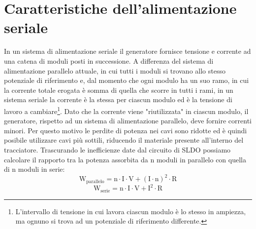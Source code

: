 \section{Caratteristiche dell'alimentazione seriale}
In un sistema di alimentazione seriale il generatore fornisce tensione e corrente ad una catena di moduli posti in successione. 
A differenza del sistema di alimentazione parallelo attuale, in cui tutti i moduli si trovano allo stesso potenziale di riferimento e, dal momento che ogni modulo ha un suo ramo, in cui la corrente totale  erogata è somma di quella che scorre in tutti i rami, in un sistema seriale la corrente è la stessa per ciascun modulo ed è la tensione di lavoro a cambiare\footnote{L'intervallo di tensione in cui lavora ciascun modulo è lo stesso in ampiezza, ma ognuno si trova ad un potenziale di riferimento differente.}. 
Dato che la corrente viene "riutilizzata" in ciascun modulo, il generatore, rispetto ad un sistema di alimentazione parallelo, deve fornire correnti minori. Per questo motivo le perdite di potenza nei cavi sono ridotte ed è quindi posibile utilizzare cavi più sottili, riducendo il materiale presente all'interno del tracciatore.
Trascurando le inefficienze date dal circuito di SLDO possiamo calcolare il rapporto tra la potenza assorbita da n moduli in parallelo con quella di n moduli in serie:
\begin{equation}
\mathrm{W_{parallelo} = n \cdot I \cdot V + (I\cdot n)^2 \cdot R}
\end{equation}
\begin{equation}
\mathrm{W_{serie} = n \cdot I \cdot V + I^2 \cdot R}
\end{equation}
